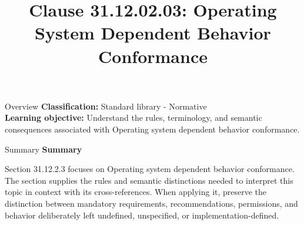 \documentclass[10pt,letterpaper]{article}
\title{Clause 31.12.02.03: Operating System Dependent Behavior Conformance}
\author{}
\date{}
\begin{document}
\maketitle
\begin{CornellOverviewBox}{Overview}
\textbf{Classification:} Standard library - Normative\\[2pt]
\textbf{Learning objective:} Understand the rules, terminology, and semantic consequences associated with Operating system dependent behavior conformance.
\end{CornellOverviewBox}\begin{CornellSummaryBox}{Summary}
{\sffamily\bfseries\color{Accent} Summary}\par\vspace{3pt}Section 31.12.2.3 focuses on Operating system dependent behavior conformance. The section supplies the rules and semantic distinctions needed to interpret this topic in context with its cross-references. When applying it, preserve the distinction between mandatory requirements, recommendations, permissions, and behavior deliberately left undefined, unspecified, or implementation-defined.
\end{CornellSummaryBox}
\end{document}
